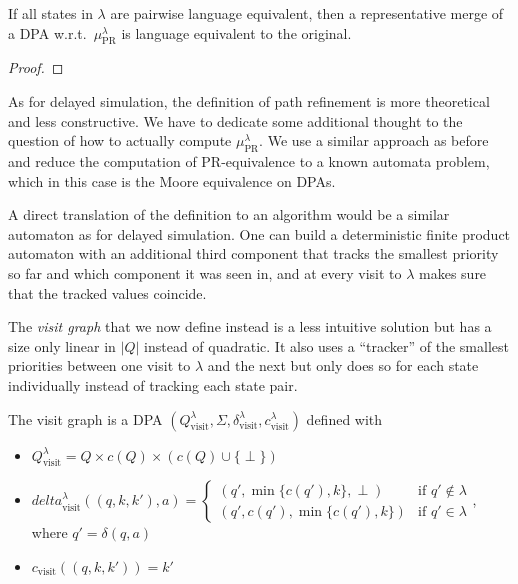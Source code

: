 \begin{theorem}
	If all states in $\lambda$ are pairwise language equivalent, then a representative merge of a DPA w.r.t.\ $\mu_\text{PR}^\lambda$ is language equivalent to the original.
\end{theorem}

\begin{proof}
\end{proof}

As for delayed simulation, the definition of path refinement is more theoretical and less constructive. We have to dedicate some additional thought to the question of how to actually compute $\mu_\text{PR}^\lambda$. We use a similar approach as before and reduce the computation of PR-equivalence to a known automata problem, which in this case is the Moore equivalence on DPAs.

A direct translation of the definition to an algorithm would be a similar automaton as for delayed simulation. One can build a deterministic finite product automaton with an additional third component that tracks the smallest priority so far and which component it was seen in, and at every visit to $\lambda$ makes sure that the tracked values coincide.

The \emph{visit graph} that we now define instead is a less intuitive solution but has a size only linear in $|Q|$ instead of quadratic. It also uses a \enquote{tracker} of the smallest priorities between one visit to $\lambda$ and the next but only does so for each state individually instead of tracking each state pair.

\begin{definition}
	The visit graph is a DPA $(Q_\text{visit}^\lambda, \Sigma, \delta_\text{visit}^\lambda, c_\text{visit}^\lambda)$ defined with
	\begin{itemize}
		\item $Q_\text{visit}^\lambda = Q \times c(Q) \times (c(Q) \cup \{\perp\})$
		\item $delta_\text{visit}^\lambda((q, k, k'), a) = \begin{cases}
			(q', \min \{c(q'), k\}, \perp) & \text{if } q' \notin \lambda \\
			(q', c(q'), \min \{c(q'), k\}) & \text{if } q' \in \lambda
		\end{cases}$, where $q' = \delta(q, a)$
		\item $c_\text{visit}((q, k, k')) = k'$
	\end{itemize}
\end{definition}

